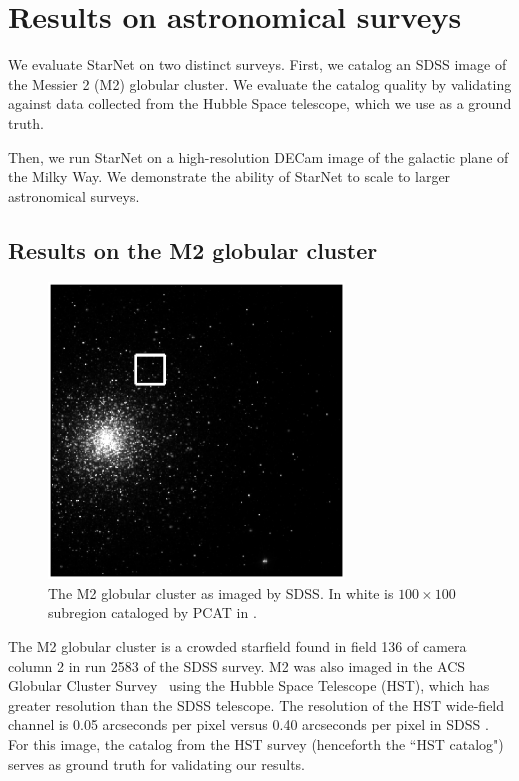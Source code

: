 \section{Results on astronomical surveys}

We evaluate StarNet on two distinct surveys. First, we catalog an SDSS image of the Messier 2 (M2) globular cluster. 
We evaluate the catalog quality by validating against data collected from 
the Hubble Space telescope, which we use as a ground truth. 

Then, we run StarNet on a high-resolution DECam image of the galactic plane of the Milky Way. 
We demonstrate the ability of StarNet to scale to larger astronomical surveys.

\subsection{Results on the M2 globular cluster}
\label{sec:results_on_m2}

\begin{figure}[tb]
    \centering
    \includegraphics[width=0.7\textwidth]{figures_vg/m2_results/m2_regions.eps}
    \caption{The M2 globular cluster as imaged by SDSS. In white is $100 \times 100$ subregion 
    cataloged by PCAT in \cite{Feder_2019}. }
    \label{fig:m2_region}
\end{figure}

The M2 globular cluster is a crowded starfield found in field 136 of camera column 2 in run 2583 of the SDSS survey. 
M2 was also imaged in the ACS Globular Cluster Survey~\citep{Sarajedini_2007}
using the Hubble Space Telescope (HST),
which has greater resolution than the SDSS telescope.
The resolution of the HST wide-field channel is 0.05 arcseconds per pixel versus
0.40 arcseconds per pixel in SDSS \citep{hubble_about, sdss_about}.
For this image, the catalog from the HST survey (henceforth the ``HST catalog")
serves as ground truth for validating our results.

